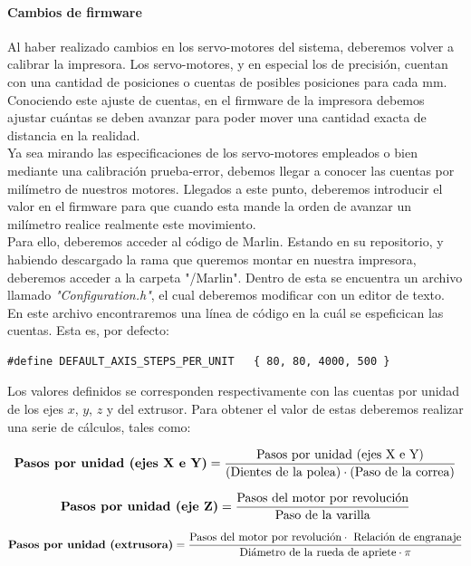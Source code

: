 \documentclass[a4paper,12pt]{article}
\begin{document}
\paragraph{Cambios de firmware}
Al haber realizado cambios en los servo-motores del sistema, deberemos volver a calibrar la impresora. Los servo-motores, y en especial los de precisión, cuentan con una cantidad de posiciones o cuentas de posibles posiciones para cada mm. Conociendo este ajuste de cuentas, en el firmware de la impresora debemos ajustar cuántas se deben avanzar para poder mover una cantidad exacta de distancia en la realidad.\\

Ya sea mirando las especificaciones de los servo-motores empleados o bien mediante una calibración prueba-error, debemos llegar a conocer las cuentas por milímetro de nuestros motores. Llegados a este punto, deberemos introducir el valor en el firmware para que cuando esta mande la orden de avanzar un milímetro realice realmente este movimiento.\\

Para ello, deberemos acceder al código de Marlin. Estando en su repositorio, y habiendo descargado la rama que queremos montar en nuestra impresora, deberemos acceder a la carpeta "/Marlin". Dentro de esta se encuentra un archivo llamado \emph{"Configuration.h"}, el cual deberemos modificar con un editor de texto.\\

En este archivo encontraremos una línea de código en la cuál se espeficican las cuentas. Esta es, por defecto:
\begin{lstlisting}
#define DEFAULT_AXIS_STEPS_PER_UNIT   { 80, 80, 4000, 500 }
\end{lstlisting}

Los valores definidos se corresponden respectivamente con las cuentas por unidad de los ejes $x$, $y$, $z$ y del extrusor. Para obtener el valor de estas deberemos realizar una serie de cálculos, tales como:

$$ \text{\textbf{Pasos por unidad (ejes X e Y)}} = \frac{\text{Pasos por unidad  (ejes X e Y)}}{\text{(Dientes de la polea)}\cdot \text{(Paso de la correa)}}$$
	
$$ \text{\textbf{Pasos por unidad (eje Z)}} = \frac{\text{Pasos del motor por revolución}}{\text{Paso de la varilla}}$$
	
$$ \text{\textbf{Pasos por unidad (extrusora)}} = \frac{\text{Pasos del motor por revolución} \cdot \text{ Relación de engranaje}}{\text{Diámetro de la rueda de apriete}\cdot \pi}$$
\end{document}
